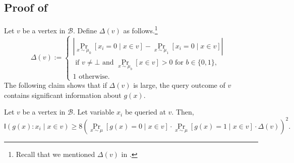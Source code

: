 \documentclass{toc}
\newcommand{\clB}{\mathcal{B}}
\newcommand{\I}{\mathsf{I}}
\begin{document}
\subsection{Proof of {}}
\label{key-inf}
Let $v$ be a vertex in $\clB$. Define $\Delta(v)$ as follows.\footnote{Recall that we mentioned $\Delta(v)$ in .}
\[\Delta(v):=\left\{\begin{array}{lll}|\Pr_{x \sim \mu_0} [x_i=0 \mid x \in v]-\Pr_{x \sim \mu_1} [x_i=0 \mid x \in v]| &\\
\mbox{\ \ \ \ \ \ \ \ \ \ \ \ \ \ \ \ \ \ \ \ if $v \neq \bot$ and $\Pr_{x \sim \mu_b} [x \in v]>0$ for $b \in \{0,1\}$,} \\ 1\mbox{\ \ \ \ \ \ \ \ \ \ \ \ \ \ \ \ \ \ otherwise.} \end{array}\right.\]
The following claim shows that if $\Delta(v)$ is large, the query outcome of $v$ contains significant information about $g(x)$.
\begin{claim}
\label{mutin}
Let $v$ be a vertex in $\clB$. Let variable $x_i$ be queried at $v$. Then,
\[\I(g(x) : x_i \mid x \in v)  \geq 8 \left(\Pr_{x \sim \mu}[g(x)=0 \mid x \in v] \cdot \Pr_{x \sim \mu}[g(x)=1 \mid x \in v] \cdot \Delta(v)\right)^2.\]
\end{claim}
\end{document}
